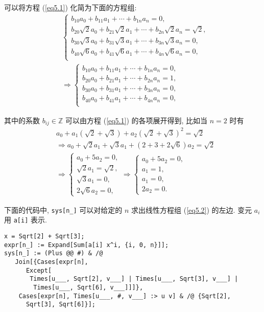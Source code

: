 \documentclass[color=black,device=normal,lang=cn,mode=geye]{elegantnote}
\begin{document}
\begin{solution}
    可以将方程 (\ref{eq5.1}) 化简为下面的方程组:
    \begin{align}\label{eq5.2}
        & \begin{cases}
            b_{10}a_0+b_{11}a_1+\cdots+b_{1n}a_n=0, \\
            b_{20}\sqrt{2}a_0+b_{21}\sqrt{2}a_1+\cdots+b_{2n}\sqrt{2}a_n=\sqrt{2}, \\
            b_{30}\sqrt{3}a_0+b_{31}\sqrt{3}a_1+\cdots+b_{3n}\sqrt{3}a_n=0, \\
            b_{40}\sqrt{6}a_0+b_{41}\sqrt{6}a_1+\cdots+b_{4n}\sqrt{6}a_n=0, \\
        \end{cases}\nonumber \\
        & \Rightarrow\begin{cases}
            b_{10}a_0+b_{11}a_1+\cdots+b_{1n}a_n=0, \\
            b_{20}a_0+b_{21}a_1+\cdots+b_{2n}a_n=1, \\
            b_{30}a_0+b_{31}a_1+\cdots+b_{3n}a_n=0, \\
            b_{40}a_0+b_{41}a_1+\cdots+b_{4n}a_n=0, \\
        \end{cases}
    \end{align}

    其中的系数 $b_{ij}\in\mathbb{Z}$ 可以由方程 (\ref{eq5.1}) 的各项展开得到, 比如当 $n=2$ 时有
    \begin{align*}
        & a_0+a_1(\sqrt{2}+\sqrt{3})+a_2(\sqrt{2}+\sqrt{3})^2=\sqrt{2} \\
        & \Rightarrow a_0+\sqrt{2}a_1+\sqrt{3}a_1+(2+3+2\sqrt{6})a_2=\sqrt{2} \\
        & \Rightarrow\begin{cases}
            a_0+5a_2=0, \\
            \sqrt{2}a_1=\sqrt{2}, \\
            \sqrt{3}a_1=0, \\
            2\sqrt{6}a_2=0,
        \end{cases}\Rightarrow\begin{cases}
            a_0+5a_2=0, \\
            a_1=1, \\
            a_1=0, \\
            2a_2=0.
        \end{cases}
    \end{align*}

    下面的代码中, \verb|sys[n_]| 可以对给定的 $n$ 求出线性方程组 (\ref{eq5.2}) 的左边. 变元 $a_i$ 用 \verb|a[i]| 表示.
    \begin{verbatim}
x = Sqrt[2] + Sqrt[3];
expr[n_] := Expand[Sum[a[i] x^i, {i, 0, n}]];
sys[n_] := (Plus @@ #) & /@ 
   Join[{Cases[expr[n], 
      Except[
       Times[u___, Sqrt[2], v___] | Times[u___, Sqrt[3], v___] | 
        Times[u___, Sqrt[6], v___]]]}, 
    Cases[expr[n], Times[u___, #, v___] :> u v] & /@ {Sqrt[2], 
      Sqrt[3], Sqrt[6]}];\end{verbatim}
    

\end{solution}
\end{document}
